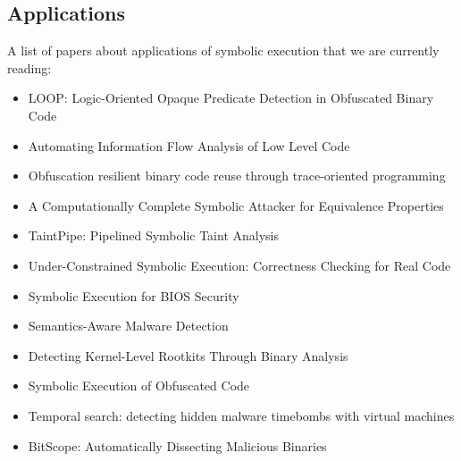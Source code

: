 \documentclass[10pt, a4paper]{article}
\begin{document}
\subsection{Applications}
A list of papers about applications of symbolic execution that we are currently reading:
\begin{itemize}
  \item \cite{LOOP-CCS15} LOOP: Logic-Oriented Opaque Predicate Detection in Obfuscated Binary Code
  \item \cite{BDG-CCS14} Automating Information Flow Analysis of Low Level Code
  \item \cite{ZFM-CCS13} Obfuscation resilient binary code reuse through trace-oriented programming
  \item \cite{BC-CCS14} A Computationally Complete Symbolic Attacker for Equivalence Properties
  \item \cite{MWX-USEC15} TaintPipe: Pipelined Symbolic Taint Analysis
  \item \cite{RE-USEC15} Under-Constrained Symbolic Execution: Correctness Checking for Real Code
  \item \cite{BLR-WOOT15} Symbolic Execution for {BIOS} Security
  \item \cite{CJS-SP05} Semantics-Aware Malware Detection
  \item \cite{KRV-ACSAC04} Detecting Kernel-Level Rootkits Through Binary Analysis
  \item \cite{YBD-CCS15} Symbolic Execution of Obfuscated Code
  \item \cite{CWO-ASPLOS06} Temporal search: detecting hidden malware timebombs with virtual machines
  \item \cite{BHK-TR07} BitScope: Automatically Dissecting Malicious Binaries
\end{itemize}

  
\end{document}
